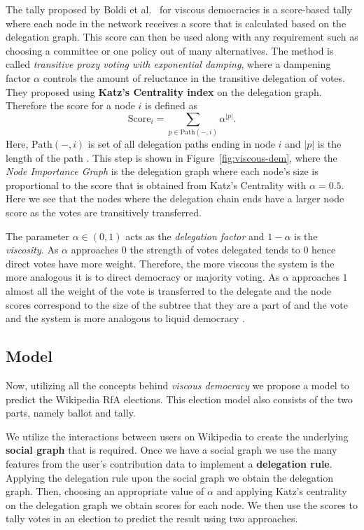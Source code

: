 The tally proposed by Boldi et al.\ \cite{ViscousDemocracy} for viscous democracies is a score-based tally where each node in the network receives a score that is calculated based on the delegation graph. This score can then be used along with any requirement such as choosing a committee or one policy out of many alternatives. The method is called \textit{transitive proxy voting with exponential damping}, where a dampening factor $\alpha$ controls the amount of reluctance in the transitive delegation of votes. They proposed using \textbf{Katz's Centrality index} on the delegation graph. Therefore the score for a node $i$ is defined as 
\[\text{Score}_{i}  = \sum_{p \in \text{Path}(-,i)} \alpha^{|p|}.\]
Here, $\text{Path}(-,i)$ is set of all delegation paths ending in node $i$ and $|p|$ is the length of the path \cite{ViscousDemocracy}. This step is shown in Figure~\ref{fig:viscous-dem}, where the \textit{Node Importance Graph} is the delegation graph where each node's size is proportional to the score that is obtained from Katz's Centrality with $\alpha=0.5$. Here we see that the nodes where the delegation chain ends have a larger node score as the votes are transitively transferred.

The parameter $\alpha\in (0,1)$ acts as the \textit{delegation factor} and $1-\alpha$ is the \textit{viscosity}. As $\alpha$ approaches $0$ the strength of votes delegated tends to $0$ hence direct votes have more weight. Therefore, the more viscous the system is the more analogous it is to direct democracy or majority voting. As $\alpha$ approaches $1$ almost all the weight of the vote is transferred to the delegate and the node scores correspond to the size of the subtree that they are a part of and the vote and the system is more analogous to liquid democracy \cite{ViscousDemocracy}.

\subsection{Model} 
Now, utilizing all the concepts behind \textit{viscous democracy} we propose a model to predict the Wikipedia RfA elections. This election model also consists of the two parts, namely ballot and tally. 

We utilize the interactions between users on Wikipedia to create the underlying \textbf{social graph} that is required. Once we have a social graph we use the many features from the user's contribution data to implement a \textbf{delegation rule}. Applying the delegation rule upon the social graph we obtain the delegation graph. Then, choosing an appropriate value of $\alpha$ and applying Katz's centrality on the delegation graph we obtain scores for each node. We then use the scores to tally votes in an election to predict the result using two approaches.


